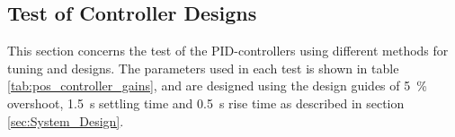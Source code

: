\documentclass[../../main.tex]{subfiles}
\begin{document}
\subsection{Test of Controller Designs}
This section concerns the test of the PID-controllers using different methods for tuning and designs. The parameters used in each test is shown in table \ref{tab:pos_controller_gains}, and are designed using the design guides of \SI{5}{\percent} overshoot, \SI{1,5}{\second} settling time and \SI{0,5}{\second} rise time as described in section \ref{sec:System_Design}.
\end{document}
